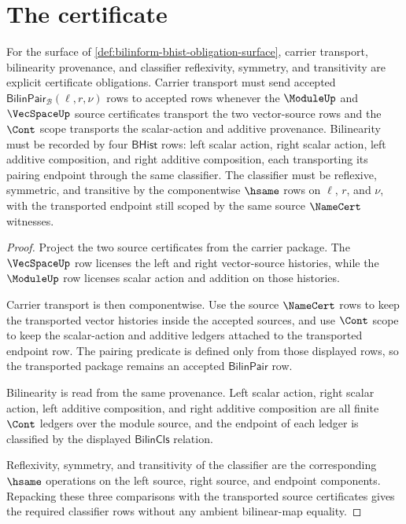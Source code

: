 \section{The certificate}
\label{sec:bilinform-certificate}


\begin{theorem}
\label{thm:bilinform-carrier-classifier-obligations}
For the surface of \autoref{def:bilinform-bhist-obligation-surface}, carrier transport, bilinearity provenance, and classifier reflexivity, symmetry, and transitivity are explicit certificate obligations. Carrier transport must send accepted $\mathsf{BilinPair}_{\mathcal{B}}(\ell,r,\nu)$ rows to accepted rows whenever the $\ModuleUp$ and $\VecSpaceUp$ source certificates transport the two vector-source rows and the $\Cont$ scope transports the scalar-action and additive provenance. Bilinearity must be recorded by four $\mathsf{BHist}$ rows: left scalar action, right scalar action, left additive composition, and right additive composition, each transporting its pairing endpoint through the same classifier. The classifier must be reflexive, symmetric, and transitive by the componentwise $\hsame$ rows on $\ell$, $r$, and $\nu$, with the transported endpoint still scoped by the same source $\NameCert$ witnesses.
\end{theorem}
\begin{proof}
Project the two source certificates from the carrier package. The $\VecSpaceUp$ row licenses the left and right vector-source histories, while the $\ModuleUp$ row licenses scalar action and addition on those histories.

Carrier transport is then componentwise. Use the source $\NameCert$ rows to keep the transported vector histories inside the accepted sources, and use $\Cont$ scope to keep the scalar-action and additive ledgers attached to the transported endpoint row. The pairing predicate is defined only from those displayed rows, so the transported package remains an accepted $\mathsf{BilinPair}$ row.

Bilinearity is read from the same provenance. Left scalar action, right scalar action, left additive composition, and right additive composition are all finite $\Cont$ ledgers over the module source, and the endpoint of each ledger is classified by the displayed $\mathsf{BilinCls}$ relation.

Reflexivity, symmetry, and transitivity of the classifier are the corresponding $\hsame$ operations on the left source, right source, and endpoint components. Repacking these three comparisons with the transported source certificates gives the required classifier rows without any ambient bilinear-map equality.
\end{proof}

